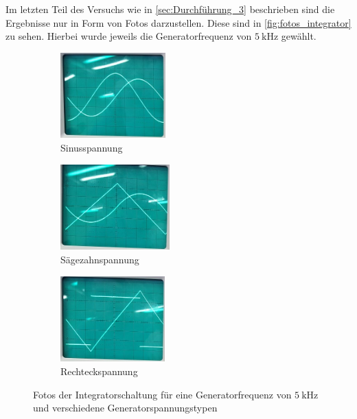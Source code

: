 Im letzten Teil des Versuchs wie in \autoref{sec:Durchführung_3} beschrieben sind die Ergebnisse nur in Form von Fotos darzustellen. Diese sind in \autoref{fig:fotos_integrator} zu sehen. Hierbei wurde jeweils die Generatorfrequenz von $\SI{5}{\kilo\hertz}$ gewählt.

\begin{figure}
    \centering
    \begin{subfigure}{0.3\textwidth}
        \centering
        \includegraphics[height=3.3cm]{images/foto_03_ausschnitt.jpg}
        \caption{Sinusspannung}
        \label{fig:foto_sin_integrator}
    \end{subfigure}
    \begin{subfigure}{0.3\textwidth}
        \centering
        \includegraphics[height=3.3cm]{images/foto_04_ausschnitt.jpg}
        \caption{Sägezahnspannung}
        \label{fig:foto_saege_integrator}
    \end{subfigure}
    \begin{subfigure}{0.3\textwidth}
        \centering
        \includegraphics[height=3.3cm]{images/foto_05_ausschnitt.jpg}
        \caption{Rechteckspannung}
        \label{fig:foto_rechteck_integrator}
    \end{subfigure}
    \caption{Fotos der Integratorschaltung für eine Generatorfrequenz von $\SI{5}{\kilo\hertz}$ und verschiedene Generatorspannungstypen}
    \label{fig:fotos_integrator}
\end{figure}